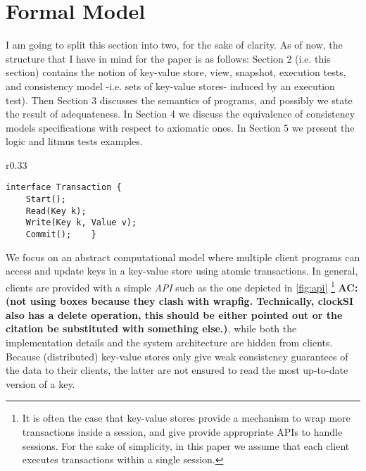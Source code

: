 \section{Formal Model}
\label{sec:model}
\label{sec:semantics}
\ac{I am going to split this section into two, for the sake of clarity. 
As of now, the structure that I have in mind for the paper is as follows: 
Section 2 (i.e. this section) contains the notion of key-value store, view, snapshot, 
execution tests, and consistency model  -i.e. sets of key-value stores- 
induced by an execution test). Then Section 3 discusses 
the semantics of programs, and possibly we state the result 
of adequateness. In Section 4 we discuss the equivalence of consistency 
models specifications with respect to axiomatic ones. In Section 5 
we present the logic and litmus tests examples.}

\begin{wrapfigure}[7]{r}{0.33\textwidth}
\vspace{-10pt}
\begin{verbatim}
interface Transaction {
    Start(); 
    Read(Key k);
    Write(Key k, Value v); 
    Commit();    }
\end{verbatim}
\vspace{-10pt}
\caption{Example of Transaction API.}
\label{fig:api}
\end{wrapfigure}
We focus on an abstract computational model where multiple client programs can access and update keys in a key-value store using atomic transactions. 
In general, clients are provided with a simple \textit{API} such as the one depicted in \cref{fig:api} \cite{gdur,physicsnmsi,clockSI}\footnote{It is 
often the case that key-value stores provide a mechanism to wrap more transactions inside a session, and give 
provide appropriate APIs to handle sessions. For the sake of simplicity, in this paper we assume that each client executes transactions 
within a single session.}
\textbf{AC: (not using boxes because they clash with wrapfig. Technically, clockSI also has a delete operation, this should be either pointed out 
or the citation be substituted with something else.)}, while both the implementation details and the system architecture are hidden from clients. 
Because (distributed) key-value stores only give weak consistency guarantees of the data to their clients, the latter are 
not ensured to read the most up-to-date version of a key.

